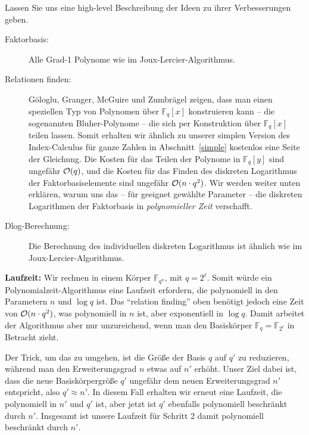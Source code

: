 \begin{refsegment}
Lassen Sie uns eine high-level Beschreibung der Ideen zu ihrer Verbesserungen geben.

\begin{description}
\item[Faktorbasis:] Alle Grad-1 Polynome wie im Joux-Lercier-Algorithmus.

\item[Relationen finden:] G\"ologlu, Granger, McGuire und Zumbr\"agel zeigen, dass man einen speziellen Typ von Polynomen über $\mathbb{F}_q[x]$ konstruieren kann -- die sogenannten Bluher-Polynome -- die sich per Konstruktion über $\mathbb{F}_q[x]$ teilen lassen. Somit erhalten wir ähnlich zu unserer simplen Version des Index-Calculus für ganze Zahlen in Abschnitt~\ref{simple} kostenlos eine Seite der Gleichung. Die Kosten für das Teilen der Polynome in $\mathbb{F}_q[y]$ sind ungefähr ${\cal O}(q)$, und die Kosten für das Finden des diskreten Logarithmus der Faktorbasiselemente sind ungefähr ${\cal O}(n \cdot q^2)$. Wir werden weiter unten erklären, warum uns das -- für geeignet gewählte Parameter -- die diskreten Logarithmen der Faktorbasis in {\em polynomieller Zeit} verschafft.

\item[Dlog-Berechnung:] Die Berechnung des individuellen diskreten Logarithmus ist ähnlich wie im Joux-Lercier-Algorithmus.
\end{description}

\noindent \textbf{Laufzeit:} Wir rechnen in einem Körper $\mathbb{F}_{q^n}$, mit $q=2^{\ell}$. Somit würde ein Polynomialzeit-Algorithmus eine Laufzeit erfordern, die polynomiell in den Parametern $n$ und $\log q$ ist. Das "`relation finding"' oben benötigt jedoch eine Zeit von ${\cal O}(n \cdot q^2)$, was polynomiell in $n$ ist, aber exponentiell in $\log q$. Damit arbeitet der Algorithmus aber nur unzureichend, wenn man den Basiskörper $\mathbb{F}_q = \mathbb{F}_{2^{\ell}}$ in Betracht zieht.

Der Trick, um das zu umgehen, ist die Größe der Basis $q$ auf $q'$ zu reduzieren, während man den Erweiterungsgrad $n$ etwas auf $n'$ erhöht. Unser Ziel dabei ist, dass die neue Basiskörpergröße $q'$ ungefähr dem neuen Erweiterungsgrad $n'$ entspricht, also $q' \approx n'$. In diesem Fall erhalten wir erneut eine Laufzeit, die polynomiell in $n'$ und $q'$ ist, aber jetzt ist $q'$ ebenfalls polynomiell beschränkt durch $n'$. Insgesamt ist unsere Laufzeit für Schritt 2 damit polynomiell beschränkt durch $n'$.\\[0.1cm]


\end{refsegment}
